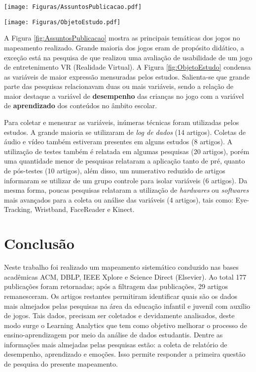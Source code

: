 \documentclass[12pt]{article}
\begin{document}
\begin{figure*}[!htb]
    \centering
    \begin{minipage}{.5\textwidth}
        \centering
        \texttt{[image: Figuras/AssuntosPublicacao.pdf]}
        \caption{Artigos por assunto}\label{fig:AssuntosPublicacao}
    \end{minipage}%
    \begin{minipage}{0.5\textwidth}
        \centering
        \texttt{[image: Figuras/ObjetoEstudo.pdf]}
        \caption{Percentual das variáveis mensuradas nos artigos}\label{fig:ObjetoEstudo}
    \end{minipage}
\end{figure*}

A Figura \ref{fig:AssuntosPublicacao} mostra as principais temáticas dos jogos no mapeamento realizado. Grande maioria dos jogos eram de propósito didático, a exceção está na pesquisa de  que realizou uma avaliação de usabilidade de  um jogo de entretenimento VR (Realidade Virtual). A Figura \ref{fig:ObjetoEstudo} condensa as variáveis de maior expressão mensuradas pelos estudos. Salienta-se que grande parte das pesquisas relacionavam duas ou mais variáveis, sendo a relação de maior destaque a variável de \textbf{desempenho} das crianças no jogo com a variável de \textbf{aprendizado} dos conteúdos no âmbito escolar. 

Para coletar e mensurar as variáveis, inúmeras técnicas foram utilizadas pelos estudos. A grande maioria se utilizaram de \textit{log de dados} (14 artigos). Coletas de áudio e vídeo também estiveram presentes em alguns estudos (8 artigos). A utilização de testes também é relatada em algumas pesquisas (20 artigos), porém uma quantidade menor de pesquisas relataram a aplicação tanto de pré, quanto de pós-testes (10 artigos), além disso, um numerativo reduzido de artigos informaram se utilizar de um grupo controle para isolar variáveis (6 artigos). Da mesma forma, poucas pesquisas relataram a utilização de \textit{hardwares} ou \textit{softwares} mais avançados para a coleta ou análise das variáveis (4 artigos), tais como: Eye-Tracking, Wristband, FaceReader e Kinect.


\section{Conclusão}\label{secao:conclusao}

Neste trabalho foi realizado um mapeamento sistemático conduzido nas bases acadêmicas ACM, DBLP, IEEE Xplore e Science Direct (Elsevier). Ao total 177 publicações foram retornadas; após a filtragem das publicações, 29 artigos remanesceram. Os artigos restantes permitiram identificar quais são os dados mais almejados pelas pesquisas na área da educação infantil e juvenil com auxílio de jogos. Tais dados, precisam ser coletados e devidamente analisados, deste modo surge o Learning Analytics que tem como objetivo melhorar o processo de ensino-aprendizagem por meio da análise de dados estudantis. Dentre as informações mais almejadas pelas pesquisas estão: a coleta de relatório de desempenho, aprendizado e emoções. Isso permite responder a primeira questão de pesquisa do presente mapeamento. 
\end{document}
